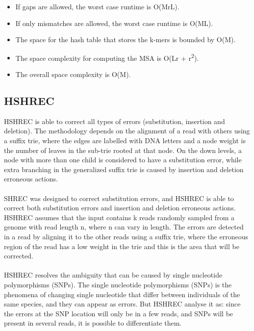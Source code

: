 \documentclass[12pt]{llncs}
\begin{document}
\begin{itemize}
	\item If gaps are allowed, the worst case runtime is O(MrL).
	\item If only mismatches are allowed, the worst case runtime is O(ML).
	\item The space for the hash table that stores the k-mers is bounded by O(M).
	\item The space complexity for computing the MSA is O(Lr + r\textsuperscript{2}).
	\item The overall space complexity is O(M).
\end{itemize}

\subsection{HSHREC}
HSHREC \cite{HShrec} is able to correct all types of errors (substitution, insertion and deletion). The methodology depends on the alignment of a read with others using a suffix trie, where the edges are labelled with DNA letters and a node weight is the number of leaves in the sub-trie rooted at that node. On the down levels, a node with more than one child is considered to have a substitution error, while extra branching in the generalized suffix trie is caused by insertion and deletion erroneous actions.
\\
\\
SHREC was designed to correct substitution errors, and HSHREC is able to correct both substitution errors and insertion and deletion erroneous actions.
\\
HSHREC assumes that the input contains k reads randomly sampled from a genome with read length n, where n can vary in length. The errors are detected in a read by aligning it to the other reads using a suffix trie, where the erroneous region of the read has a low weight in the trie and this is the area that will be corrected.
\\
\\
HSHREC resolves the ambiguity that can be caused by single nucleotide polymorphisms (SNPs). The single nucleotide polymorphisms (SNPs) is the phenomena of changing single nucleotide that differ between individuals of the same species, and they can appear as errors. But HSHREC analyse it as: since the errors at the SNP location will only be in a few reads, and SNPs will be present in several reads, it is possible to differentiate them.
\\
\\
\end{document}
